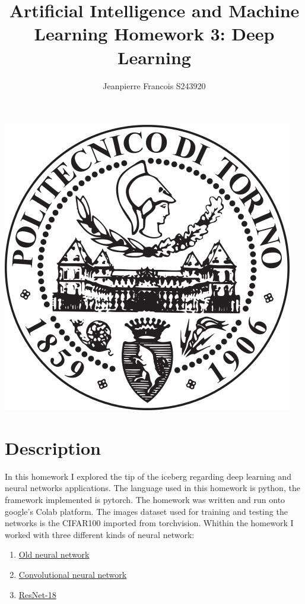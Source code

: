 \documentclass[11pt]{article}
\title{%
    Artificial Intelligence and Machine Learning\newline
    \large \newline Homework 3: Deep Learning
    }
\author{Jeanpierre Francois S243920}
\makeatletter
\def\maxwidth{\ifdim\Gin@nat@width>\linewidth\linewidth
  \else\Gin@nat@width\fi}
\let\Oldincludegraphics\includegraphics
\renewcommand{\includegraphics}[1]{\Oldincludegraphics[width=.8\maxwidth]{#1}}
\makeatother
\begin{document}
    \maketitle
    \begin{center}
      \includegraphics{polito_logo.png}
    \end{center}
    \newpage

\section{Description}\label{description}
In this homework I explored the tip of the iceberg regarding deep learning and neural networks applications. \newline
The language used in this homework is python, the framework implemented is pytorch. \newline
The homework was written and run onto google's Colab platform. \newline
The images dataset used for training and testing the networks is the CIFAR100 imported from torchvision.\newline
Whithin the homework I worked with three different kinds of neural network:
\begin{enumerate}
  \item \hyperlink{oldnn}{Old neural network}
  \item \hyperlink{cnn}{Convolutional neural network}
  \item \hyperlink{resNet}{ResNet-18}
\end{enumerate}
\newpage
\end{document}
